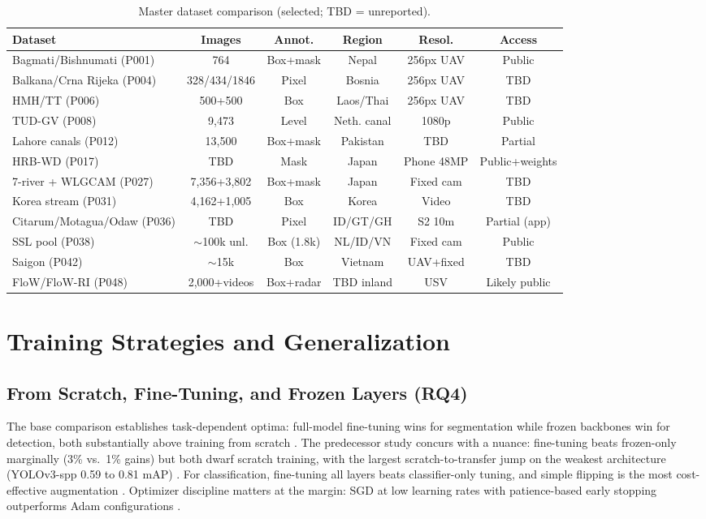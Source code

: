 \documentclass[12pt]{article}
\begin{document}
\begin{table}[!t]
\centering
\caption{Master dataset comparison (selected; TBD = unreported).}
\label{tab:datasets}
\begin{tabular}{lccccc}
\hline
\textbf{Dataset} & \textbf{Images} & \textbf{Annot.} & \textbf{Region} & \textbf{Resol.} & \textbf{Access} \\
\hline
Bagmati/Bishnumati (P001) & 764 & Box+mask & Nepal & 256px UAV & Public \\
Balkana/Crna Rijeka (P004) & 328/434/1846 & Pixel & Bosnia & 256px UAV & TBD \\
HMH/TT (P006) & 500+500 & Box & Laos/Thai & 256px UAV & TBD \\
TUD-GV (P008) & 9,473 & Level & Neth. canal & 1080p & Public \\
Lahore canals (P012) & 13,500 & Box+mask & Pakistan & TBD & Partial \\
HRB-WD (P017) & TBD & Mask & Japan & Phone 48MP & Public+weights \\
7-river + WLGCAM (P027) & 7,356+3,802 & Box+mask & Japan & Fixed cam & TBD \\
Korea stream (P031) & 4,162+1,005 & Box & Korea & Video & TBD \\
Citarum/Motagua/Odaw (P036) & TBD & Pixel & ID/GT/GH & S2 10m & Partial (app) \\
SSL pool (P038) & $\sim$100k unl. & Box (1.8k) & NL/ID/VN & Fixed cam & Public \\
Saigon (P042) & $\sim$15k & Box & Vietnam & UAV+fixed & TBD \\
FloW/FloW-RI (P048) & 2,000+videos & Box+radar & TBD inland & USV & Likely public \\
\hline
\end{tabular}
\end{table}

\section{Training Strategies and Generalization}
\label{sec:training}

\subsection{From Scratch, Fine-Tuning, and Frozen Layers (RQ4)}
The base comparison establishes task-dependent optima: full-model fine-tuning wins for segmentation while frozen backbones win for detection, both substantially above training from scratch \cite{Pati2025}. The predecessor study concurs with a nuance: fine-tuning beats frozen-only marginally (3\% vs.\ 1\% gains) but both dwarf scratch training, with the largest scratch-to-transfer jump on the weakest architecture (YOLOv3-spp 0.59 to 0.81 mAP) \cite{Maharjan2022}. For classification, fine-tuning all layers beats classifier-only tuning, and simple flipping is the most cost-effective augmentation \cite{JiaFrontiers2023}. Optimizer discipline matters at the margin: SGD at low learning rates with patience-based early stopping outperforms Adam configurations \cite{WCSE2024}.
\end{document}
